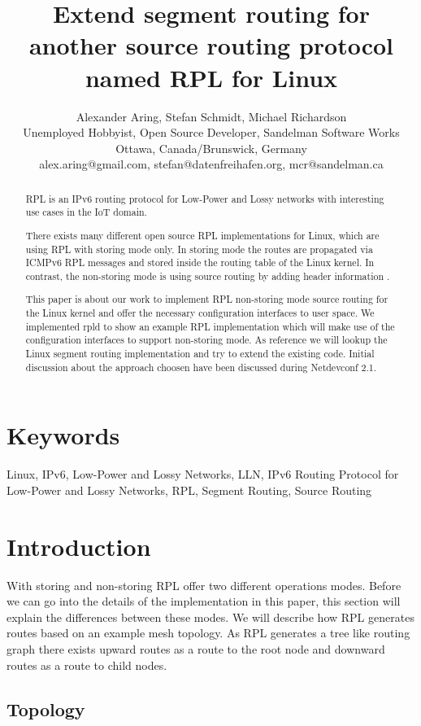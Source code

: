 \documentclass[letterpaper]{article}
\title{Extend segment routing for another source routing protocol named RPL for Linux}
\author{Alexander Aring, Stefan Schmidt, Michael Richardson\\
Unemployed Hobbyist, Open Source Developer, Sandelman Software Works\\
Ottawa, Canada/Brunswick, Germany\\
alex.aring@gmail.com, stefan@datenfreihafen.org, mcr@sandelman.ca\\
\newline
\newline
}
\begin{document}
\maketitle
\begin{abstract}
RPL \cite{RFC6550} is an IPv6 routing protocol for Low-Power and Lossy networks with interesting use cases in the IoT domain.

There exists many different open source RPL implementations for Linux, which are using RPL with storing mode only.
In storing mode the routes are propagated via ICMPv6 RPL messages and stored inside the routing table of the Linux kernel.
In contrast, the non-storing mode is using source routing by adding header information \cite{RFC6554}.

This paper is about our work to implement RPL non-storing mode source routing for the Linux
kernel and offer the necessary configuration interfaces to user space.
We implemented rpld \cite{rpld} to show an example RPL implementation which will
make use of the configuration interfaces to support non-storing mode.
As reference we will lookup the Linux segment routing implementation and try to extend the existing code.
Initial discussion about the approach choosen have been discussed during Netdevconf 2.1.
\end{abstract}

\section{Keywords}

Linux, IPv6, Low-Power and Lossy Networks, LLN, IPv6 Routing Protocol for Low-Power and Lossy Networks, RPL, Segment Routing, Source Routing

\section{Introduction}

With storing and non-storing RPL offer two different operations modes.
Before we can go into the details of the implementation in this paper, this section will explain the differences between these modes.
We will describe how RPL generates routes based on an example mesh topology.
As RPL generates a tree like routing graph there exists upward routes as a route to the root node and downward routes as a route to child nodes.

\subsection{Topology}
\end{document}
